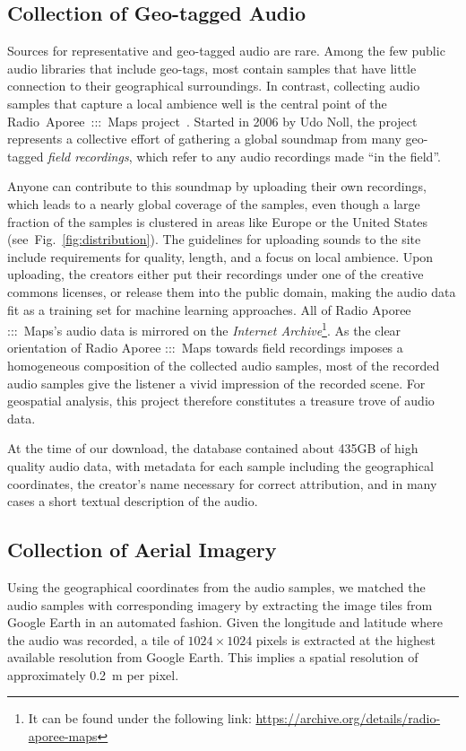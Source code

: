 \documentclass[journal]{IEEEtran}
\begin{document}
\subsection{Collection of Geo-tagged Audio}
Sources for representative and geo-tagged audio are rare.
Among the few public audio libraries that include geo-tags,
most contain samples that have little connection to their geographical surroundings.
In contrast, collecting audio samples that capture a local ambience well
is the central point of the
Radio~Aporee~:::~Maps project~\cite{noll_radio_2019}.
Started in 2006 by Udo Noll,
the project represents a collective effort of gathering a global soundmap from many geo-tagged \emph{field recordings},
which refer to any audio recordings made ``in the field''.

Anyone can contribute to this soundmap by uploading their own recordings,
which leads to a nearly global coverage of the samples,
even though a large fraction of the samples is clustered in areas like Europe
or the United States (see~Fig.~\ref{fig:distribution}).
The guidelines for uploading sounds to the site include requirements for quality, length, and a focus on local ambience. 
Upon uploading, the creators either put their recordings under one of the creative commons licenses,
or release them into the public domain,
making the audio data fit as a training set for machine learning approaches.
All of Radio Aporee :::~Maps's audio data is mirrored on the \emph{Internet Archive}\footnote{It can be found under the following link:
    \url{https://archive.org/details/radio-aporee-maps}
}.
As the clear orientation of Radio Aporee :::~Maps towards field recordings
imposes a homogeneous composition of the collected audio samples,
most of the recorded audio samples give the listener a vivid impression of the recorded scene.
For geospatial analysis, this project therefore constitutes a treasure trove of audio data.

At the time of our download,
the database contained about 435GB of high quality audio data,
with metadata for each sample including the geographical coordinates,
the creator's name necessary for correct attribution,
and in many cases a short textual description of the audio.

\subsection{Collection of Aerial Imagery}
Using the geographical coordinates from the audio samples, we matched the audio samples with corresponding imagery by extracting the image tiles from Google Earth
in an automated fashion.
Given the longitude and latitude where the audio was recorded, a tile of $1024 \times 1024$ pixels is extracted
at the highest available resolution from Google Earth.
This implies a spatial resolution of approximately \SI{0.2}{\metre} per pixel.
\end{document}

